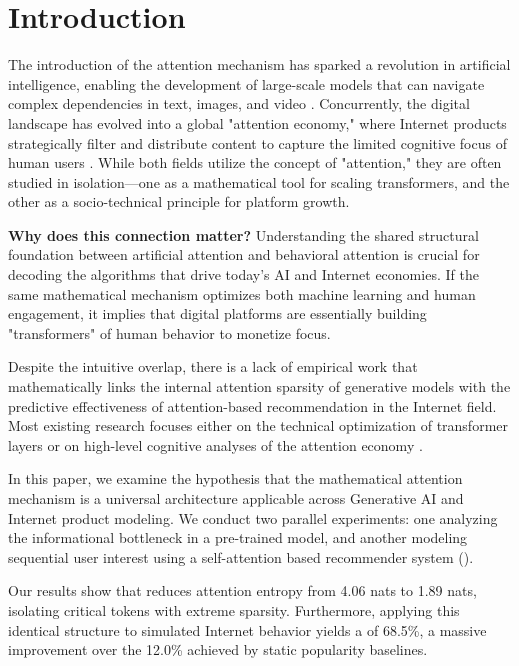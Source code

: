 \section{Introduction}
\label{sec:intro}

The introduction of the attention mechanism \cite{vaswani2017attention} has sparked a revolution in artificial intelligence, enabling the development of large-scale models that can navigate complex dependencies in text, images, and video \cite{dosovitskiy2021image}. Concurrently, the digital landscape has evolved into a global "attention economy," where Internet products strategically filter and distribute content to capture the limited cognitive focus of human users \cite{gonzalez2024attention}. While both fields utilize the concept of "attention," they are often studied in isolation—one as a mathematical tool for scaling transformers, and the other as a socio-technical principle for platform growth.

{\bf Why does this connection matter?} Understanding the shared structural foundation between artificial attention and behavioral attention is crucial for decoding the algorithms that drive today's AI and Internet economies. If the same mathematical mechanism optimizes both machine learning and human engagement, it implies that digital platforms are essentially building "transformers" of human behavior to monetize focus.

Despite the intuitive overlap, there is a lack of empirical work that mathematically links the internal attention sparsity of generative models with the predictive effectiveness of attention-based recommendation in the Internet field. Most existing research focuses either on the technical optimization of transformer layers or on high-level cognitive analyses of the attention economy \cite{pilgrim2021rising}.

In this paper, we examine the hypothesis that the mathematical attention mechanism is a universal architecture applicable across Generative AI and Internet product modeling. We conduct two parallel experiments: one analyzing the informational bottleneck in a pre-trained \gpttwo model, and another modeling sequential user interest using a self-attention based recommender system (\sasrec). 

Our results show that \gpttwo reduces attention entropy from 4.06 nats to 1.89 nats, isolating critical tokens with extreme sparsity. Furthermore, applying this identical structure to simulated Internet behavior yields a \hrfive of 68.5\%, a massive improvement over the 12.0\% achieved by static popularity baselines.

